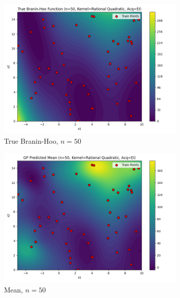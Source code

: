\documentclass[a4paper,12pt]{article}
\begin{document}
\begin{figure}[H]
\begin{subfigure}{0.3\textwidth}
  \includegraphics[width=\linewidth]{Task-02/images/true_function_rational_quadratic_n50_EI.png}
  \caption{True Branin-Hoo, $n=50$}
\end{subfigure}
\begin{subfigure}{0.3\textwidth}
    \includegraphics[width=\linewidth]{Task-02/images/gp_mean_rational_quadratic_n50_EI.png}
    \caption{Mean, $n=50$}
\end{subfigure}
\begin{subfigure}{0.3\textwidth}

\end{subfigure}
\end{figure}
\end{document}
